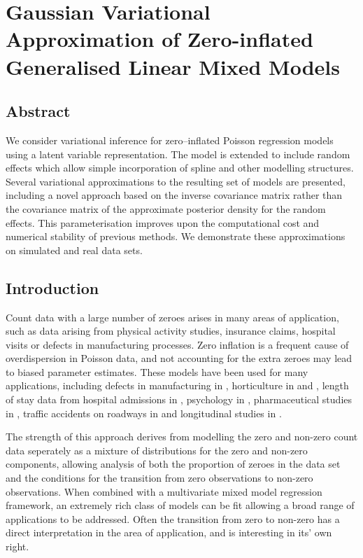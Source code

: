 \chapter{Gaussian Variational Approximation of Zero-inflated Generalised
         Linear Mixed Models}


\noindent
    
\section{Abstract}
We consider variational inference for zero--inflated Poisson
regression models using a latent variable representation. The model is
extended to include random effects which allow simple incorporation of
spline and other modelling structures. Several variational approximations
to the resulting set of models are presented, including a novel approach
based on the inverse covariance matrix rather than the covariance matrix of
the approximate posterior density for the random effects. This
parameterisation improves upon the computational cost and numerical
stability of previous methods. We demonstrate these approximations on
simulated and real data sets.

\section{Introduction}
\label{sec:introduction}

Count data with a large number of zeroes arises in many areas of application,
such as data arising from physical activity studies, insurance claims, hospital
visits or defects in manufacturing processes. Zero inflation is a frequent
cause of overdispersion in Poisson data, and not accounting for the extra
zeroes may lead to biased parameter estimates. These models have been used for
many applications, including defects in manufacturing in \cite{lambert1992},
horticulture in \cite{BIOM:BIOM1030} and \cite{BIOM:BIOM1030}, length of stay
data from hospital admissions in \cite{BIMJ:BIMJ200390024}, psychology in
\cite{JOFP:rethink}, pharmaceutical studies in \cite{Min01042005}, traffic
accidents on roadways in \cite{Shankar1997829} and longitudinal studies in
\cite{LeeWangScottYauMcLachlan2006}.

The strength of this approach derives from modelling the zero and non-zero
count data seperately as a mixture of distributions for the zero and non-zero
components, allowing analysis of both the proportion of zeroes in the data set
and the conditions for the transition from zero observations to non-zero
observations. When combined with a multivariate mixed model regression
framework, an extremely rich class of models can be fit allowing a broad range
of applications to be addressed. Often the transition from zero to non-zero has
a direct interpretation in the area of application, and is interesting in its'
own right.

